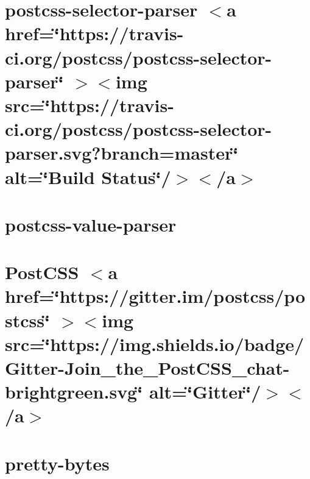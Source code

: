 \documentclass[twoside]{book}
\newcommand{\+}{\discretionary{\mbox{\scriptsize$\hookleftarrow$}}{}{}}
\begin{document}
\chapter{postcss-\/selector-\/parser \texorpdfstring{$<$}{<}a href=\char`\"{}https\+://travis-\/ci.\+org/postcss/postcss-\/selector-\/parser\char`\"{} \texorpdfstring{$>$}{>}\texorpdfstring{$<$}{<}img src=\char`\"{}https\+://travis-\/ci.\+org/postcss/postcss-\/selector-\/parser.\+svg?branch=master\char`\"{} alt=\char`\"{}\+Build Status\char`\"{}/\texorpdfstring{$>$}{>}\texorpdfstring{$<$}{<}/a\texorpdfstring{$>$}{>}}
\label{md__c___users_vaishnavi_jadhav__desktop__developer_code_mean_stack_example_client_node_modules_p45f5c1ae90d96accbaa066ebbfd7d7d6}

\chapter{postcss-\/value-\/parser}
\label{md__c___users_vaishnavi_jadhav__desktop__developer_code_mean_stack_example_client_node_modules_p878b7edc4ebbd38bdbcebde5c36df69e}

\chapter{Post\+CSS \texorpdfstring{$<$}{<}a href=\char`\"{}https\+://gitter.\+im/postcss/postcss\char`\"{} \texorpdfstring{$>$}{>}\texorpdfstring{$<$}{<}img src=\char`\"{}https\+://img.\+shields.\+io/badge/\+Gitter-\/\+Join\+\_\+the\+\_\+\+Post\+CSS\+\_\+chat-\/brightgreen.\+svg\char`\"{} alt=\char`\"{}\+Gitter\char`\"{}/\texorpdfstring{$>$}{>}\texorpdfstring{$<$}{<}/a\texorpdfstring{$>$}{>}}
\label{md__c___users_vaishnavi_jadhav__desktop__developer_code_mean_stack_example_client_node_modules_postcss__r_e_a_d_m_e}

\chapter{pretty-\/bytes}
\label{md__c___users_vaishnavi_jadhav__desktop__developer_code_mean_stack_example_client_node_modules_pretty_bytes_readme}

\end{document}
